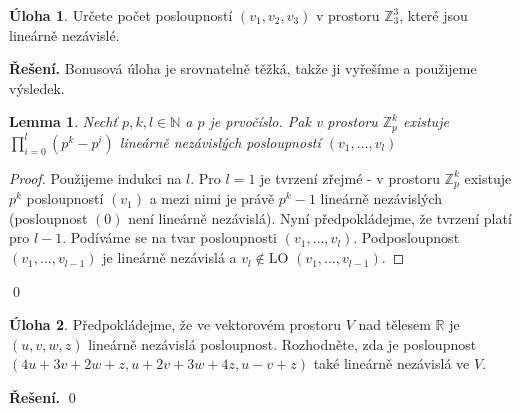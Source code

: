 \documentclass{article}
\theoremstyle{definition}
\newtheorem{uloha}{Úloha}
\theoremstyle{plain}
\newtheorem{lemma}{Lemma}
\newcommand{\R}{\mathbb{R}}
\newcommand{\N}{\mathbb{N}}
\newenvironment{reseni}{\noindent\textbf{Řešení.}\hspace{0.5em}}{\hfill\qed\medskip}
\begin{document}
\begin{uloha}
Určete počet posloupností $(v_1, v_2, v_3)$ v prostoru $\mathbb{Z}_3^3$, které jsou lineárně nezávislé.
\end{uloha}
\begin{reseni}
Bonusová úloha je srovnatelně těžká, takže ji vyřešíme a použijeme výsledek.
\begin{lemma}
Nechť $p, k, l \in \N$ a $p$ je prvočíslo. Pak v prostoru $\mathbb{Z}_p^k$ existuje $\prod_{i=0}^{l} (p^k-p^i)$ lineárně nezávislých posloupností $(v_1, \hdots, v_l)$
\end{lemma}
\begin{proof}
Použijeme indukci na $l$. Pro $l = 1$ je tvrzení zřejmé - v prostoru $\mathbb{Z}_p^k$ existuje $p^k$ posloupností $(v_1)$ a mezi nimi je právě $p^k-1$ lineárně nezávislých (posloupnost $(0)$ není lineárně nezávislá).
Nyní předpokládejme, že tvrzení platí pro $l-1$. Podíváme se na tvar posloupnosti $(v_1, \hdots, v_l)$. Podposloupnost $(v_1, \hdots, v_{l-1})$ je lineárně nezávislá
a $v_l \notin \text{LO } (v_1, \hdots, v_{l-1})$.
\end{proof}
\end{reseni}
\begin{uloha}
Předpokládejme, že ve vektorovém prostoru $V$ nad tělesem $\R$ je $(u, v, w, z)$ lineárně nezávislá
posloupnost. Rozhodněte, zda je posloupnost $(4u + 3v + 2w + z, u + 2v + 3w + 4z, u - v + z)$ také
lineárně nezávislá ve $V$.
\end{uloha}
\begin{reseni}
\end{reseni}
\end{document}
